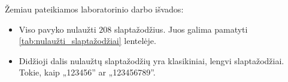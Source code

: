 \label{sec:isvados}

Žemiau pateikiamos laboratorinio darbo išvados:
\begin{itemize}
    \item Viso pavyko nulaužti $208$ slaptažodžius. Juos galima pamatyti \ref{tab:nulaužti_slaptažodžiai} lentelėje.
    \item Didžioji dalis nulaužtų slaptažodžių yra klasikiniai, lengvi slaptažodžiai. Tokie, kaip „123456” ar „123456789”.
\end{itemize}